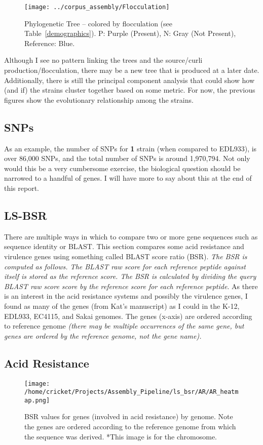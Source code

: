\documentclass[11pt]{article}
\begin{document}
\begin{figure}[ht!]\normalsize %
\centering
\texttt{[image: ../corpus\_assembly/Flocculation]}
\caption{Phylogenetic Tree -- colored by flocculation (see Table~\ref{demographics}). P: Purple (Present), N: Gray (Not Present), Reference: Blue.}
\label{flocculation_tree}
\end{figure}

Although I see no pattern linking the trees and the source/curli production/flocculation, there may be a new tree that is produced at a later date. Additionally, there is still the principal component analysis that could show how (and if) the strains cluster together based on some metric. For now, the previous figures show the evolutionary relationship among the strains.\\

\subsection*{SNPs}
As an example, the number of SNPs for \textbf{1} strain (when compared to EDL933), is over 86,000 SNPs, and the total number of SNPs is around 1,970,794. Not only would this be a very cumbersome exercise, the biological question should be narrowed to a handful of genes. I will have more to say about this at the end of this report. \\

\subsection*{LS-BSR}
There are multiple ways in which to compare two or more gene sequences such as sequence identity or BLAST. This section compares some acid resistance and virulence genes using something called BLAST score ratio (BSR). \textit{The BSR is computed as follows. The BLAST raw score for each reference peptide against itself is stored as the reference score. The BSR is calculated by dividing the query BLAST raw score score by the reference score for each reference peptide}. As there is an interest in the acid resistance systems and possibly the virulence genes, I found as many of the genes (from Kat's manuscript) as I could in the K-12, EDL933, EC4115, and Sakai genomes. The genes (x-axis) are ordered according to reference genome \textit{(there may be multiple occurrences of the same gene, but genes are ordered by the reference genome, not the gene name).}

\subsection*{Acid Resistance}
\begin{figure}[h!]\normalsize %
\centering
\texttt{[image: /home/cricket/Projects/Assembly\_Pipeline/ls\_bsr/AR/AR\_heatmap.png]}
\caption{BSR values for genes (involved in acid resistance) by genome. Note the genes are ordered according to the reference genome from which the sequence was derived. *This image is for the chromosome.}
\label{ARheatmap}
\end{figure}
\clearpage
\end{document}
